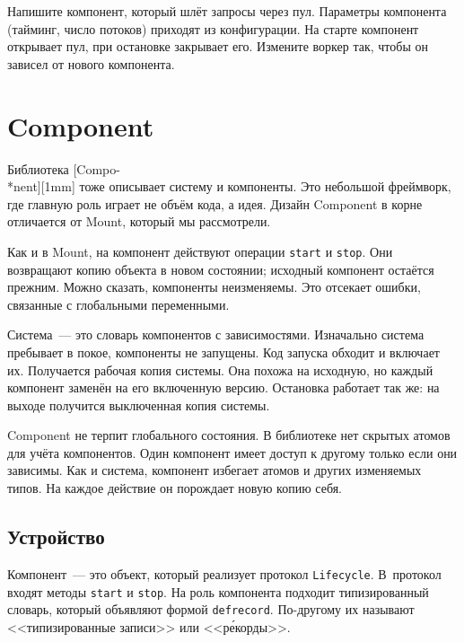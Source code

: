 \fi


Напишите компонент, который шлёт запросы через пул. Параметры компонента
(тайминг, число потоков) приходят из конфигурации. На старте компонент открывает
пул, при остановке закрывает его. Измените воркер так, чтобы он зависел от
нового компонента.

\section{Component}


Библиотека [Compo-\\*nent][1mm] тоже
описывает систему и компоненты. Это небольшой фреймворк, где главную роль играет
не объём кода, а идея. Дизайн Component в корне отличается от Mount, который мы
рассмотрели.


Как и в Mount, на компонент действуют операции \verb|start| и \verb|stop|. Они
возвращают копию объекта в новом состоянии; исходный компонент остаётся
прежним. Можно сказать, компоненты неизменяемы. Это отсекает ошибки, связанные с
глобальными переменными.

Система~--- это словарь компонентов с зависимостями. Изначально система
пребывает в покое, компоненты не запущены. Код запуска обходит и включает
их. Получается рабочая копия системы. Она похожа на исходную, но каждый
компонент заменён на его включенную версию. Остановка работает так же: на выходе
получится выключенная копия системы.

Component не терпит глобального состояния. В библиотеке нет скрытых атомов для
учёта компонентов. Один компонент имеет доступ к другому только если они
зависимы. Как и система, компонент избегает атомов и других изменяемых типов. На
каждое действие он порождает новую копию себя.

\subsection{Устройство}

\label{defrecord}

Компонент~--- это объект, который реализует протокол \verb|Lifecycle|. В~протокол
входят методы \verb|start| и \verb|stop|. На роль компонента подходит
типизированный словарь, который объявляют формой \verb|defrecord|. По-другому их
называют <<типизированные записи>> или <<р\'{е}корды>>.

